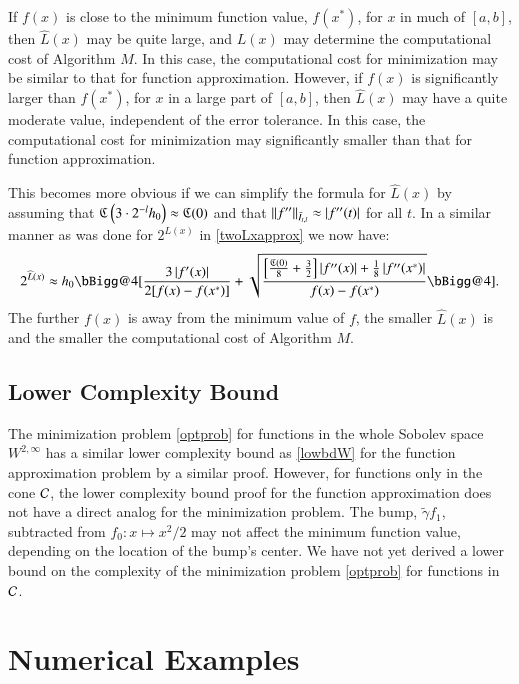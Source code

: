 \documentclass[review]{elsarticle}
\makeatletter
\newcommand{\vast}{\bBigg@{4}}
\theoremstyle{definition}
\newcommand{\vastl}{\mathopen\vast}
\newcommand{\vastr}{\mathclose\vast}
\renewcommand{\cw}{W}
\newcommand{\chL}{\widehat{L}}
\newcommand{\tgamma}{\widetilde{\gamma}}
\makeatother
\begin{document}
If $f(x)$ is close to the minimum function value, $f(x^*)$, for $x$ in much of
$[a,b]$, then $\chL(x)$ may be quite large, and $L(x)$ may determine the
computational cost of Algorithm $M$. In this case, the computational cost for
minimization may be similar to that for function approximation. However, if
$f(x)$ is significantly larger than $f(x^*)$, for $x$ in a large part of
$[a,b]$, then $\chL(x)$ may have a quite moderate value, independent of the
error tolerance. In this case, the computational cost for minimization may
significantly smaller than that for function approximation.

This becomes more obvious if we can simplify the formula for $\chL(x)$ by
assuming that $\fC\left(3\cdot2^{-l}h_0\right) \approx \fC(0)$ and that
$\norm[\bar{I}_{t,l}]{f''} \approx \abs{f''(t)}$ for all $t$. In a similar
manner as was done for $2^{L(x)}$ in \eqref{twoLxapprox} we now have:
\begin{equation*}
 2^{\chL(x)}
\approx h_0\vastl[\frac{3 \abs{f'(x)}}{2[f(x) - f(x^*)]}
+  \sqrt{\frac{\Bigl[\frac {\fC\left(0\right)}8  + \frac 32 \Bigr]  \abs{f''(x)} + \frac18\abs{f''(x^*)} }{f(x) - f(x^*)}} \vastr].
\end{equation*}
The further $f(x)$ is away from the minimum value of $f$, the smaller $\chL(x)$
is and the smaller the computational cost of Algorithm $M$.

\subsection{Lower Complexity Bound} \label{subsec:optcomp}

The minimization problem \eqref{optprob} for functions in the whole Sobolev
space $\cw^{2,\infty}$ has a similar lower complexity bound as \eqref{lowbdW}
for the function approximation problem by a similar proof. However, for
functions only in the cone $\cc$, the lower complexity bound proof for the
function approximation does not have a direct analog for the minimization
problem. The bump, $\tgamma f_1$, subtracted from $f_0: x \mapsto x^2/2$ may not
affect the minimum function value, depending on the location of the bump's
center. We have not yet derived a lower bound on the complexity of the
minimization problem \eqref{optprob} for functions in $\cc$.


\section{Numerical Examples} \label{sec:examples}
\end{document}
